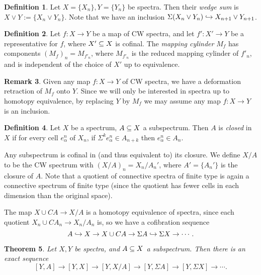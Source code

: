 \documentclass[11pt, titlepage]{article} %
\def\subq{\ensuremath\subseteq}
\def\inj{\ensuremath\hookrightarrow}
\numberwithin{equation}{subsection}
\theoremstyle{plain}
\newtheorem{theorem}{Theorem}[subsection]
\theoremstyle{definition}
\newtheorem{definition}[theorem]{Definition}
\newtheorem{remark}[theorem]{Remark}
\begin{document}
\begin{definition}
Let \(X=\{X_n\}, Y=\{Y_n\}\) be spectra. Then their \textit{wedge sum} is \(X\vee Y :=\{X_n \vee Y_n\}\). Note that %
we have an inclusion \(\Sigma(X_n\vee Y_n)\inj X_{n+1}\vee Y_{n+1}\). 
\end{definition}

\begin{definition}
Let \(f : X \to Y\) be a map of CW spectra, and let \(f' : X' \to Y\) be a representative for \(f\), where \(X'\subq X\) is cofinal. The \textit{mapping cylinder} \(M_f\) has components \((M_f)_n=M_{f'_n}\), where \(M_{f'_n}\) is the reduced mapping cylinder of \(f'_n\), and is independent of the choice of \(X'\) up to equivalence.
\end{definition}

\begin{remark}\label{2504231152}
Given any map \(f : X \to Y\) of CW spectra, we have a deformation retraction of \(M_f\) onto \(Y\). Since we will only be interested in spectra up to homotopy equivalence, by replacing \(Y\) by \(M_f\) we may assume any map \(f : X \to Y\) is an inclusion. 
\end{remark}

\begin{definition}
Let \(X\) be a spectrum, \(A\subq X\) a subspectrum. Then \(A\) is \textit{closed} in \(X\) if for every cell \(e_\alpha^n\) of \(X_n\), if \(\Sigma^k e_\alpha^n \in A_{n+k}\) then \(e_\alpha^n \in A_n\). 
\end{definition}

Any subspectrum is cofinal in (and thus equivalent to) its closure. We define \(X/A\) to be the CW spectrum with \((X/A)_n=X_n/A_n'\), where \(A'=\{A_n'\}\) is the closure of \(A\). Note that a quotient of connective spectra of finite type is again a connective spectrum of finite type (since the quotient has fewer cells in each dimension than the original space).

The map \(X\cup CA\to X/A\) is a homotopy equivalence of spectra, since each quotient \(X_n \cup CA_n \to X_n/A_n\) is, so we have a cofibration sequence
\[A \inj X \to X\cup CA \to \Sigma A \inj \Sigma X \to \cdots.\]

\begin{theorem}\label{2504151709}
Let \(X,Y\) be spectra, and \(A\subq X\) a subspectrum. Then there is an exact sequence
\[[Y,A]\to[Y,X]\to[Y,X/A]\to[Y,\Sigma A]\to[Y,\Sigma X]\to\cdots.\]
\end{theorem}
\end{document}
